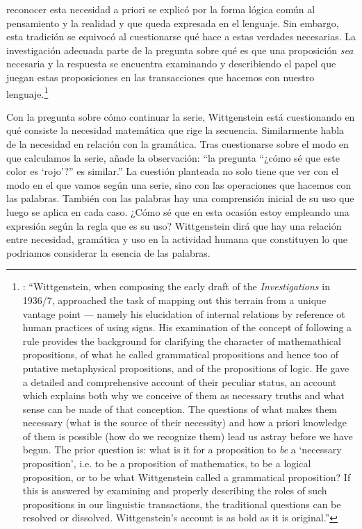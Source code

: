 reconocer esta necesidad a priori se explicó por la forma lógica común al pensamiento y la realidad y que queda expresada en el lenguaje. Sin embargo, esta tradición se equivocó al cuestionarse qué hace a estas verdades necesarias. La investigación adecuada parte de la pregunta sobre qué es que una proposición \emph{sea} necesaria y la respuesta se encuentra examinando y describiendo el papel que juegan estas proposiciones en las transacciones que hacemos con nuestro lenguaje.\footnote{\cite[Cf.~][242--243]{bakerhacker2014rules}: \enquote{Wittgenstein, when composing the early draft of the \emph{Investigations} in 1936/7, approached the task of mapping out this terrain from a unique vantage point --- namely his elucidation of internal relations by reference ot human practices of using signs. His examination of the concept of following a rule provides the background for clarifying the character of mathemathical propositions, of what he called grammatical propositions and hence too of putative metaphysical propositions, and of the propositions of logic. He gave a detailed and comprehensive account of their peculiar status, an account which explains both why we conceive of them as necessary truths and what sense can be made of that conception. The questions of what makes them necessary (what is the source of their necessity) and how a priori knowledge of them is possible (how do we recognize them) lead us astray before we have begun. The prior question is: what is it for a proposition to \emph{be} a `necessary proposition', i.e. to be a proposition of mathematics, to be a logical proposition, or to be what Wittgenstein called a grammatical proposition? If this is answered by examining and properly describing the roles of such propositions in our linguistic transactions, the traditional questions can be resolved or dissolved. Wittgenstein's account is as bold as it is original.}}

Con la pregunta sobre cómo continuar la serie, Wittgenstein está cuestionando en qué consiste la necesidad matemática que rige la secuencia. Similarmente habla de la necesidad en relación con la gramática. Tras cuestionarse sobre el modo en que calculamos la serie, añade la observación: \enquote{la pregunta ``¿cómo sé que este color es `rojo'?'' es similar.} La cuestión planteada no solo tiene que ver con el modo en el que vamos según una serie, sino con las operaciones que hacemos con las palabras. También con las palabras hay una comprensión inicial de su uso que luego se aplica en cada caso. ¿Cómo sé que en esta ocasión estoy empleando una expresión según la regla que es su uso? Wittgenstein dirá que hay una relación entre necesidad, gramática y uso en la actividad humana que constituyen lo que podriamos considerar la esencia de las palabras.


